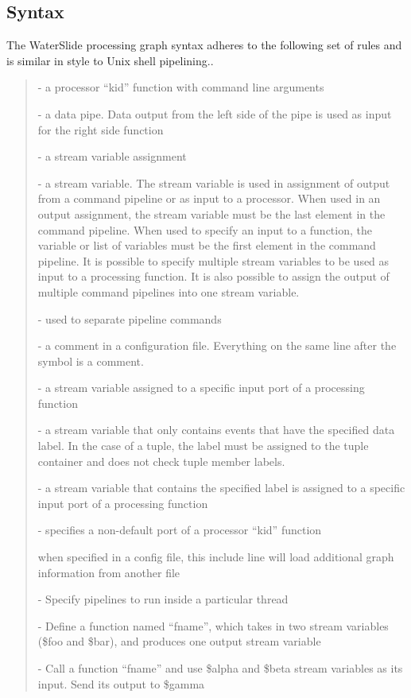 \documentclass[11pt]{article}
\begin{document}
\subsection{Syntax}
The WaterSlide processing graph syntax adheres to the following set of rules and is similar in style to Unix shell pipelining..
\begin{quote}
\begin{description}\itemsep6pt
\item [processor] - a processor ``kid'' function with command line arguments
\item [\textbar] - a data pipe.  Data output from the left side of the pipe is used as input for the right
side function
\item [-\textgreater] - a stream variable assignment
\item [\$foo] - a stream variable. The stream variable is used in assignment of output from a
command pipeline or as input to a processor.  When used in an output
assignment, the stream variable must be the last element in the command pipeline.  When used to
specify an input to a function, the variable or list of variables must be the first element in the
command pipeline.  It is possible to specify multiple stream variables to be used as input to a
processing function.  It is also possible to assign the output of multiple command pipelines into
one stream variable.
\item [;] - used to separate pipeline commands 
\item [\# and //] - a comment in a configuration file. Everything on the same line after the symbol
is a comment.
\item [\$foo:PORT] - a stream variable assigned to a specific input port of a processing function
\item [\$foo.LABEL] - a stream variable that only contains events that have the specified data label.
In the case of a tuple, the label must be assigned to the tuple container and does not check tuple
member labels.
\item [\$foo.LABEL:PORT] - a stream variable that contains the specified label is assigned to a
specific input port of a processing function
\item [PORT:processor] - specifies a non-default port of a processor ``kid'' function
\item [\#include \emph{filename}] when specified in a config file, this include line will load additional
graph information from another file
\item [\%thread(num) \{ ... \}] - Specify pipelines to run inside a 
particular thread
\item [\%func fname(\$foo, \$bar $->$ \$baz) \{ ... \}] - Define a function 
named ``fname'', which takes in two stream variables (\$foo and \$bar), and 
produces one output stream variable
\item [\%fname(\$alpha, \$beta $->$ \$gama)] - Call a function ``fname'' and 
use \$alpha and \$beta stream variables as its input.  Send its output to 
\$gamma
\end{description}
\end{quote}
\end{document}
